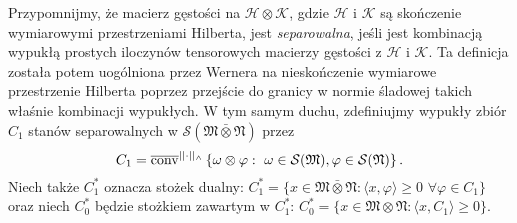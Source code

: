 Przypomnijmy, że macierz gęstości na $\mathcal{H}\otimes\mathcal{K}$,
gdzie $\mathcal{H}$ i $\mathcal{K}$
są skończenie wymiarowymi przestrzeniami Hilberta,
jest \emph{separowalna},
jeśli jest kombinacją wypukłą prostych iloczynów tensorowych macierzy gęstości
z $\mathcal{H}$ i $\mathcal{K}$.
Ta definicja została potem uogólniona przez Wernera \cite{werner1989quantum}
na nieskończenie wymiarowe przestrzenie Hilberta poprzez
przejście do granicy w normie śladowej takich właśnie kombinacji wypukłych.
W tym samym duchu, zdefiniujmy wypukły zbiór $C_1$
stanów separowalnych w
$\mathcal{S}(\mathfrak{M} \bar{\otimes} \mathfrak{N})$ przez
\begin{equation}
    \label{def:SeparableStates}
C_{1} = \overline{{\rm conv}}^{||\cdot||_{\wedge}}
\left \{\omega \otimes \varphi: \, \,\omega \in \mathcal{S}(\mathfrak{M}),
\varphi \in \mathcal{S}(\mathfrak{N})\right \}.
\end{equation}
Niech także $C_{1}^{*}$ oznacza stożek dualny:
$C_{1}^{*} = \{ x \in \mathfrak{M} \bar{\otimes} \mathfrak{N}:
 \langle x , \varphi \rangle \geq 0 \,\, \forall \varphi \in C_{1} \}$ oraz
niech $C_{0}^{*}$ będzie stożkiem zawartym w
$C_{1}^{*}$:
$C_{0}^{*} = \{ x \in \mathfrak{M} \otimes \mathfrak{N}:\langle x , C_{1} \rangle \geq 0 \}$.

